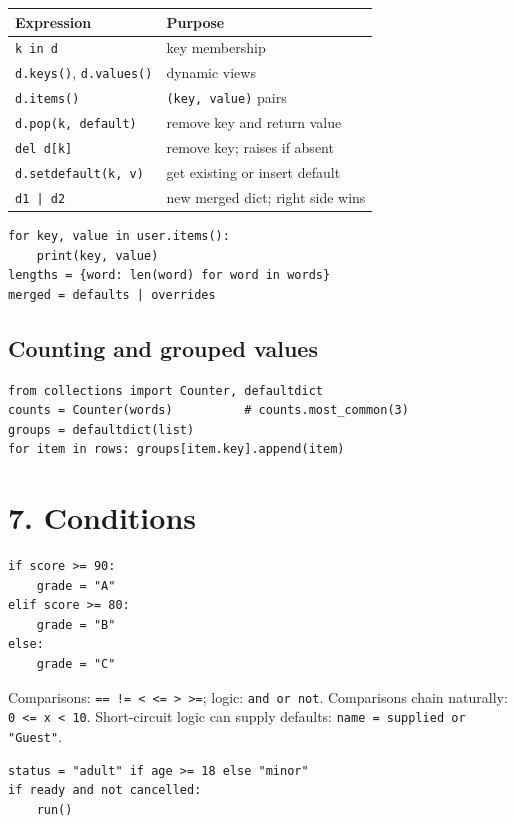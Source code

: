 \documentclass[10pt,a4paper]{article}
\newcommand{\py}[1]{\texttt{#1}}
\newenvironment{tbl}{\par\begin{lrbox}{\tblbox}\begin{minipage}{\linewidth}\compacttable}%
  {\end{minipage}\end{lrbox}\noindent\raisebox{\dp\tblbox}{\usebox{\tblbox}}\par}
\newcommand{\compacttable}{\fontsize{10}{11.2}\selectfont\setlength{\tabcolsep}{2.5pt}\renewcommand{\arraystretch}{1.08}}
\begin{document}
\begin{multicols}{2}
\begin{tbl}
\begin{tabularx}{\linewidth}{@{}R{.45\linewidth}L@{}}
\toprule
\textbf{Expression} & \textbf{Purpose} \\
\midrule
\py{k in d} & key membership \\
\py{d.keys()}, \py{d.values()} & dynamic views \\
\py{d.items()} & \py{(key, value)} pairs \\
\py{d.pop(k, default)} & remove key and return value \\
\py{del d[k]} & remove key; raises if absent \\
\py{d.setdefault(k, v)} & get existing or insert default \\
\py{d1 | d2} & new merged dict; right side wins \\
\bottomrule
\end{tabularx}
\end{tbl}

\begin{lstlisting}
for key, value in user.items():
    print(key, value)
lengths = {word: len(word) for word in words}
merged = defaults | overrides
\end{lstlisting}

\subsection{Counting and grouped values}

\begin{lstlisting}
from collections import Counter, defaultdict
counts = Counter(words)          # counts.most_common(3)
groups = defaultdict(list)
for item in rows: groups[item.key].append(item)
\end{lstlisting}

\section{7. Conditions}

\begin{lstlisting}
if score >= 90:
    grade = "A"
elif score >= 80:
    grade = "B"
else:
    grade = "C"
\end{lstlisting}

Comparisons: \py{== != < <= > >=}; logic: \py{and or not}. Comparisons chain naturally: \py{0 <= x < 10}. Short-circuit logic can supply defaults: \py{name = supplied or "Guest"}.

\begin{lstlisting}
status = "adult" if age >= 18 else "minor"
if ready and not cancelled:
    run()
\end{lstlisting}


\end{multicols}
\end{document}
